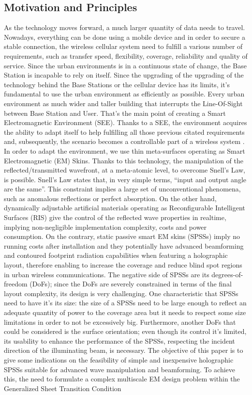\subsection{Motivation and Principles}
As the technology moves forward, a much larger quantity of data needs to travel. Nowadays, everything can be done using a mobile device and in order to secure a stable connection, the wireless cellular system need to fulfill a various number of requirements, such as transfer speed, flexibility, coverage, reliability and quality of service. Since the urban environments is in a continuous state of change, the Base Station is incapable to rely on itself. Since the upgrading of the upgrading of the technology behind the Base Stations or the cellular device has its limits, it's fundamental to use the urban environment as efficiently as possible. Every urban environment as much wider and taller building that interrupts the Line-Of-Sight between Base Station and User. That's the main point of creating a Smart Electromagnetic Environment (SEE). Thanks to a SEE, the environment acquires the ability to adapt itself to help fulfilling all those previous citated requirements and, subsequently, the scenario becomes a controllable part of a wireless system . In order to adapt the environment, we use thin meta-surfaces operating as Smart Electromagnetic (EM) Skins. Thanks to this technology, the manipulation of the reflected/transmitted wavefront, at a meta-atomic level, to overcome Snell's Law, is possible. Snell's Law states that, in very simple terms, “input and output angle are the same”. This constraint implies a large set of unconventional phenomena, such as anomalous reflections or perfect absorption. On the other hand, dynamically adjustable artificial materials operating as Reconfigurable Intelligent Surfaces (RIS) give the control of the reflected wave properties in realtime, implying non-negligible implementation complexity, costs and power consumption. On the contrary, static passive smart EM skins (SPSSs) imply no running costs after installation and they potentially have advanced beamforming and contoured footprint radiation capabilities when featuring a holographic layout, therefore enabling to increase the coverage and reduce blind spot regions in urban wireless communications. The negative side of SPSSs are its degrees-of-freedom (DoFs); since the DoFs are severely constrained in terms of the final layout complexity, its design is very challenging. One characteristic that SPSSs need to have it's its size: the size of a SPSSs need to be large enough to reflect an adequate quantity of power to the coverage area but it needs to respect some size limitations in order to not be excessively big. Furthermore, another DoFs that could be considered is the surface orientation; even though its control it’s limited, its usability to enhance the performance of the SPSSs,  respecting the incident direction of the illuminating beam, is necessary. The objective of this paper is to give some indications on the feasibility of simple and inexpensive holographic SPSSs suitable for advanced wave manipulation and beamforming. To achieve this, the need to formulate a complex multiscale EM design problem within the Generalized Sheet Transition Condition 